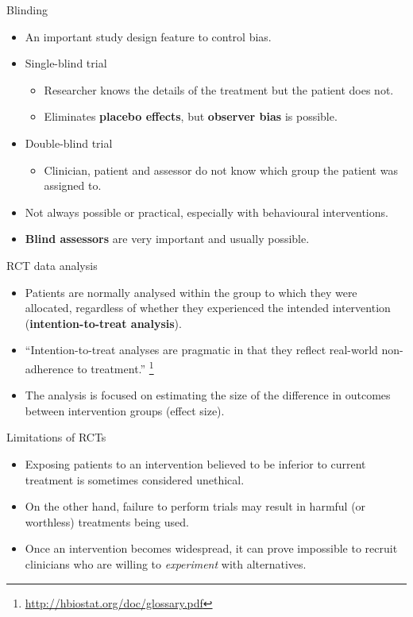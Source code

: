 \documentclass{beamer}
\begin{document}
% 
\begin{frame}{Blinding}
	\begin{itemize}
	\item An important study design feature to control bias.
	\item Single-blind trial
		\begin{itemize}
		\item Researcher knows the details of the treatment but the patient does not.
		\item Eliminates \textbf{placebo effects}, but \textbf{observer bias} is possible.
		\end{itemize}
	\item Double-blind trial
		\begin{itemize}
		\item Clinician, patient and assessor do not know which group the patient was assigned to.
		\end{itemize}
	\item Not always possible or practical, especially with behavioural interventions.
	\item \textbf{Blind assessors} are very important and usually possible.
	\end {itemize}
\end{frame}

% 
\begin{frame}{RCT data analysis}
	\begin{itemize}
	\item Patients are normally analysed within the group to which they were allocated, regardless of whether they experienced the intended intervention (\textbf{intention-to-treat analysis}).
	\item ``Intention-to-treat analyses are pragmatic in that they reflect real-world non-adherence to treatment.'' \footnote{\tiny{\url{http://hbiostat.org/doc/glossary.pdf}}}
	\item The analysis is focused on estimating the size of the difference in outcomes between intervention groups (effect size).
	\end {itemize}
\end{frame}

% 
\begin{frame}{Limitations of RCTs}
	\begin{itemize}
	\item Exposing patients to an intervention believed to be inferior to current treatment is sometimes considered unethical.
	\item On the other hand, failure to perform trials may result in harmful (or worthless) treatments being used.
	\item Once an intervention becomes widespread, it can prove impossible to recruit clinicians who are willing to \emph{experiment} with alternatives.
	\end{itemize}
\end{frame}
\end{document}
